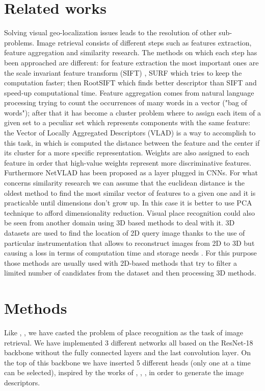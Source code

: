 \documentclass[10pt,twocolumn,letterpaper]{article}
\begin{document}
\section{Related works}
	Solving visual geo-localization issues leads to the resolution of other sub-problems.
	\newline Image retrieval consists of different steps such as features extraction, feature aggregation and similarity research.
	The methods on which each step has been approached are different: for feature extraction the most important ones are
	the scale invariant feature transform (SIFT) \cite{SIFT}, SURF \cite{SURF} which tries to keep the computation faster;
	then RootSIFT \cite{RootSIFT} which finds better descriptor than SIFT and speed-up computational time.
	\newline Feature aggregation comes from natural language processing trying to count the occurrences of many words in a vector ("bag of words");
	after that it has become a cluster problem where to assign each item of a given set to a peculiar set which represents 
	components with the same feature: the Vector of Locally Aggregated Descriptors (VLAD) \cite{VLAD} is a way to accomplish to this task, in which
	is computed the distance between the feature and the center if its cluster for a more specific representation.
	Weights are also assigned to each feature in order that high-value weights represent more discriminative features.
	Furthermore NetVLAD \cite{NETVLAD} has been proposed as a layer plugged in CNNs.
	\newline For what concerns similarity research we can assume that the euclidean distance is the oldest method to find the most similar
	vector of features to a given one and it is practicable until dimensions don't grow up. In this case it is better to use PCA technique
	to afford dimensionality reduction.
	\newline Visual place recognition could also be seen from another domain using 3D based methods to deal with it. 3D datasets are used to find
	the location of 2D query image thanks to the use of particular instrumentation that allows to reconstruct images from 2D to 3D but
	causing a loss in terms of computation time and storage needs \cite{3D}. For this purpose those methods are usually used with 2D-based methods
	that try to filter a limited number of candidates from the dataset and then processing 3D methods.

\section{Methods}
Like \cite{GEM}, \cite{NETVLAD}, \cite{CRN} we have casted the problem of place recognition as the task of image
retrieval. We have implemented 3 different networks all based on the ResNet-18 \cite{resnet} backbone
without the fully connected layers and the last convolution layer. On the top of this backbone we 
have inserted 5 different heads (only one at a time can be selected), inspired by the works of \cite{GEM}, \cite{NETVLAD}, \cite{CRN}, in order
to generate the image descriptors. 
\end{document}
